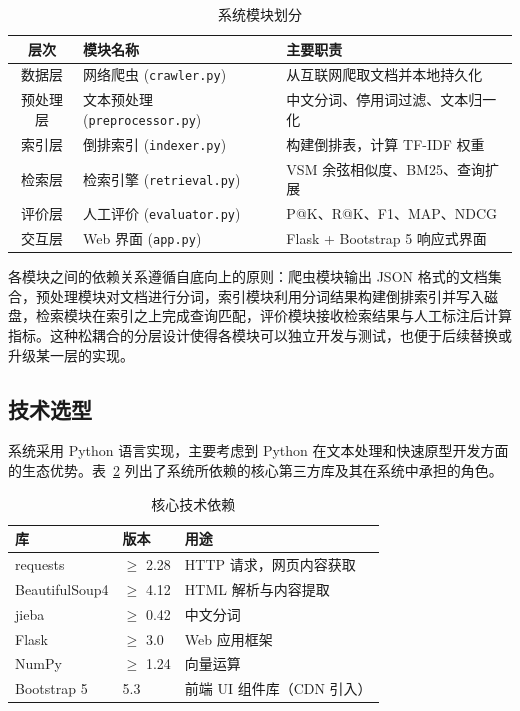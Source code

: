\documentclass[12pt, a4paper]{ctexart}
\begin{document}
\begin{table}[H]
\centering
\caption{系统模块划分}
\label{tab:modules}
\begin{tabular}{cll}
\toprule
\textbf{层次} & \textbf{模块名称} & \textbf{主要职责} \\
\midrule
数据层 & 网络爬虫 (\texttt{crawler.py}) & 从互联网爬取文档并本地持久化 \\
预处理层 & 文本预处理 (\texttt{preprocessor.py}) & 中文分词、停用词过滤、文本归一化 \\
索引层 & 倒排索引 (\texttt{indexer.py}) & 构建倒排表，计算 TF-IDF 权重 \\
检索层 & 检索引擎 (\texttt{retrieval.py}) & VSM 余弦相似度、BM25、查询扩展 \\
评价层 & 人工评价 (\texttt{evaluator.py}) & P@K、R@K、F1、MAP、NDCG \\
交互层 & Web 界面 (\texttt{app.py}) & Flask + Bootstrap 5 响应式界面 \\
\bottomrule
\end{tabular}
\end{table}

各模块之间的依赖关系遵循自底向上的原则：爬虫模块输出 JSON 格式的文档集合，预处理模块对文档进行分词，索引模块利用分词结果构建倒排索引并写入磁盘，检索模块在索引之上完成查询匹配，评价模块接收检索结果与人工标注后计算指标。这种松耦合的分层设计使得各模块可以独立开发与测试，也便于后续替换或升级某一层的实现。

\subsection{技术选型}

系统采用 Python 语言实现，主要考虑到 Python 在文本处理和快速原型开发方面的生态优势。表~\ref{tab:tech} 列出了系统所依赖的核心第三方库及其在系统中承担的角色。

\begin{table}[H]
\centering
\caption{核心技术依赖}
\label{tab:tech}
\begin{tabular}{lll}
\toprule
\textbf{库} & \textbf{版本} & \textbf{用途} \\
\midrule
requests & $\geq$ 2.28 & HTTP 请求，网页内容获取 \\
BeautifulSoup4 & $\geq$ 4.12 & HTML 解析与内容提取 \\
jieba & $\geq$ 0.42 & 中文分词 \\
Flask & $\geq$ 3.0 & Web 应用框架 \\
NumPy & $\geq$ 1.24 & 向量运算 \\
Bootstrap 5 & 5.3 & 前端 UI 组件库（CDN 引入） \\
\bottomrule
\end{tabular}
\end{table}
\end{document}
